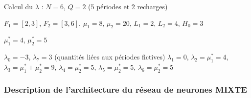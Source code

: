 \begin{Example}
	Calcul du $\lambda$ :
	$N = 6$, $Q = 2$ (5 périodes et 2 recharges)
	
	$F_1=[2,3]$, $F_2=[3,6]$, $\mu_1=8$, $\mu_2=20$, $L_1=2$, $L_2=4$, $H_0=3$
	
	$\mu_1^*=4$, $\mu_2^*=5$
	
	$\lambda_0= -3$, $\lambda_7=3$ (quantités liées aux périodes fictives)
	$\lambda_1=0$, $\lambda_2=\mu_1^*=4$, $\lambda_3=\mu_1^*+\mu_2^*=9$, $\lambda_4=\mu_2^*=5$, $\lambda_5=\mu_2^*=5$, $\lambda_6=\mu_2^*=5$
\end{Example}


 \subsubsection{Description de l'architecture du réseau de neurones \textbf{MIXTE}}

